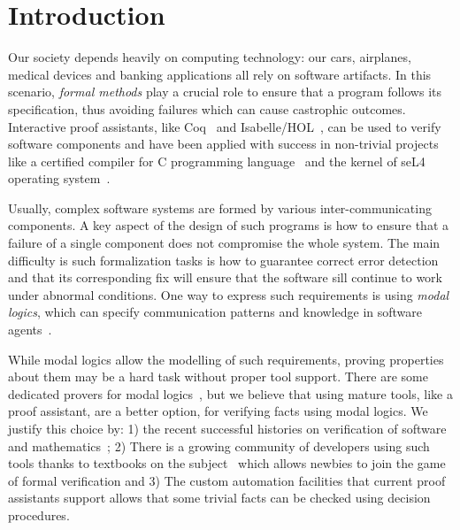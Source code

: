 \documentclass[sigconf]{acmart}
\begin{document}

\maketitle

\section{Introduction}\label{sec:intro}

Our society depends heavily on computing technology: our cars, airplanes, medical devices
and banking applications all rely on software artifacts. In this scenario,
\emph{formal methods} play a crucial role to ensure that a program follows its
specification, thus avoiding failures which can cause castrophic outcomes. Interactive
proof assistants, like Coq~\cite{manual_coq} and Isabelle/HOL~\cite{manual_isabelle}, can
be used to verify software components and have been applied with success in
non-trivial projects like a certified compiler for C programming
language~\cite{Leroy09} and the kernel of seL4 operating system~\cite{Klein10}.

Usually, complex software systems are formed by various inter-communicating
components. A key aspect of the design of such programs is how to ensure that
a failure of a single component does not compromise the whole system.
The main difficulty is such formalization tasks is how to guarantee correct
error detection and that its corresponding fix will ensure that the software
sill continue to work under abnormal conditions. One way to express such
requirements is using \emph{modal logics}, which can specify communication
patterns and knowledge in software agents~\cite{Huth_Ryan}.

While modal logics allow the modelling of such requirements, proving properties
about them may be a hard task without proper tool support. There are some
dedicated provers for modal logics~\cite{Gleissner17,Mora11}, but we believe
that using mature tools, like a proof assistant, are a better option, for
verifying facts using modal logics. We justify this choice by: 1) the recent
successful histories on verification of software and
mathematics~\cite{Leroy09,Klein10,Gonthier13,Gonthier08}; 2) There is a growing
community of developers using such tools thanks to 
textbooks on the subject~\cite{Nipkow14,Bertot10,Chlipala13} which allows
newbies to join the game of formal verification and 3) The custom automation
facilities that current proof assistants support allows that some trivial facts can
be checked using decision procedures.
\end{document}
